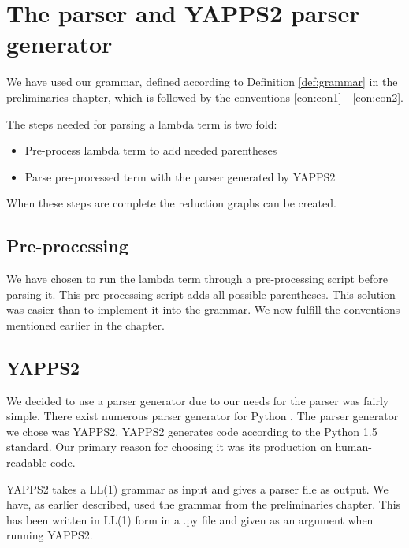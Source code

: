 
\chapter{The parser and YAPPS2 parser generator}

We have used our grammar, defined according to Definition \ref{def:grammar} in
the preliminaries chapter, which is followed by the conventions
\ref{con:con1} - \ref{con:con2}.

The steps needed for parsing a lambda term is two fold:
\begin{itemize}
	\item Pre-process lambda term to add needed parentheses
	\item Parse pre-processed term with the parser generated by YAPPS2 \cite{YAPPPS2}
\end{itemize}
When these steps are complete the reduction graphs can be created.

\section{Pre-processing}

We have chosen to run the lambda term through a pre-processing script before
parsing it. This pre-processing script adds all possible parentheses. This
solution was easier than to implement it into the grammar. We now fulfill the
conventions mentioned earlier in the chapter.

\section{YAPPS2}

We decided to use a parser generator due to our needs for the parser was
fairly simple. There exist numerous parser generator for Python
\cite{pythonParserGeneratorList}. The parser generator we chose was YAPPS2.
YAPPS2 generates code according to the Python 1.5 standard. Our primary reason
for choosing it was its production on human-readable code.

YAPPS2 takes a LL(1) grammar as input and gives a parser file as output. We
have, as earlier described, used the grammar from the preliminaries
chapter. This has been written in LL(1) form in a .py file and given as an
argument when running YAPPS2.
